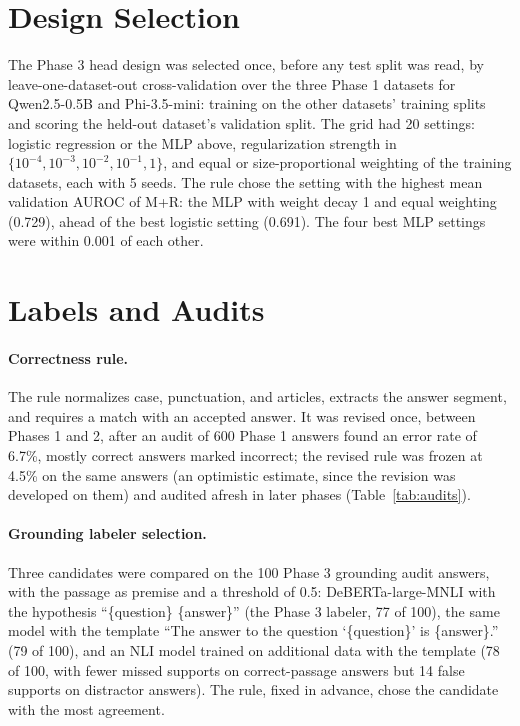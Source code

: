 \documentclass[10pt]{article}
\begin{document}
\section{Design Selection}
\label{app:selection}

The Phase 3 head design was selected once, before any test split was read, by leave-one-dataset-out cross-validation over the three Phase 1 datasets for Qwen2.5-0.5B and Phi-3.5-mini: training on the other datasets' training splits and scoring the held-out dataset's validation split. The grid had 20 settings: logistic regression or the MLP above, regularization strength in $\{10^{-4}, 10^{-3}, 10^{-2}, 10^{-1}, 1\}$, and equal or size-proportional weighting of the training datasets, each with 5 seeds. The rule chose the setting with the highest mean validation AUROC of M+R: the MLP with weight decay 1 and equal weighting (0.729), ahead of the best logistic setting (0.691). The four best MLP settings were within 0.001 of each other.

\section{Labels and Audits}
\label{app:labels}

\paragraph{Correctness rule.} The rule normalizes case, punctuation, and articles, extracts the answer segment, and requires a match with an accepted answer. It was revised once, between Phases 1 and 2, after an audit of 600 Phase 1 answers found an error rate of 6.7\%, mostly correct answers marked incorrect; the revised rule was frozen at 4.5\% on the same answers (an optimistic estimate, since the revision was developed on them) and audited afresh in later phases (Table~\ref{tab:audits}).

\paragraph{Grounding labeler selection.} Three candidates were compared on the 100 Phase 3 grounding audit answers, with the passage as premise and a threshold of 0.5: DeBERTa-large-MNLI \citep{he2021deberta} with the hypothesis ``\{question\} \{answer\}'' (the Phase 3 labeler, 77 of 100), the same model with the template ``The answer to the question `\{question\}' is \{answer\}.'' (79 of 100), and an NLI model trained on additional data \citep{laurer2024less} with the template (78 of 100, with fewer missed supports on correct-passage answers but 14 false supports on distractor answers). The rule, fixed in advance, chose the candidate with the most agreement.
\end{document}
